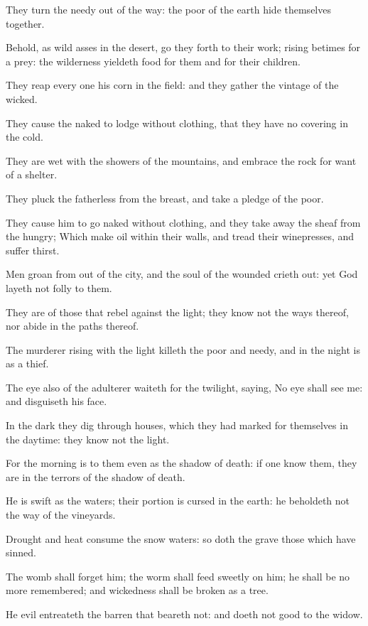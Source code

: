 \Verse They turn the needy out of the way: the poor of the earth hide themselves together.

\Verse Behold, as wild asses in the desert, go they forth to their work; rising betimes for a prey: the wilderness yieldeth food for them and for their children.

\Verse They reap every one his corn in the field: and they gather the vintage of the wicked.

\Verse They cause the naked to lodge without clothing, that they have no covering in the cold.

\Verse They are wet with the showers of the mountains, and embrace the rock for want of a shelter.

\Verse They pluck the fatherless from the breast, and take a pledge of the poor.

\Verse They cause him to go naked without clothing, and they take away the sheaf from the hungry; \Verse Which make oil within their walls, and tread their winepresses, and suffer thirst.

\Verse Men groan from out of the city, and the soul of the wounded crieth out: yet God layeth not folly to them.

\Verse They are of those that rebel against the light; they know not the ways thereof, nor abide in the paths thereof.

\Verse The murderer rising with the light killeth the poor and needy, and in the night is as a thief.

\Verse The eye also of the adulterer waiteth for the twilight, saying, No eye shall see me: and disguiseth his face.

\Verse In the dark they dig through houses, which they had marked for themselves in the daytime: they know not the light.

\Verse For the morning is to them even as the shadow of death: if one know them, they are in the terrors of the shadow of death.

\Verse He is swift as the waters; their portion is cursed in the earth: he beholdeth not the way of the vineyards.

\Verse Drought and heat consume the snow waters: so doth the grave those which have sinned.

\Verse The womb shall forget him; the worm shall feed sweetly on him; he shall be no more remembered; and wickedness shall be broken as a tree.

\Verse He evil entreateth the barren that beareth not: and doeth not good to the widow.

